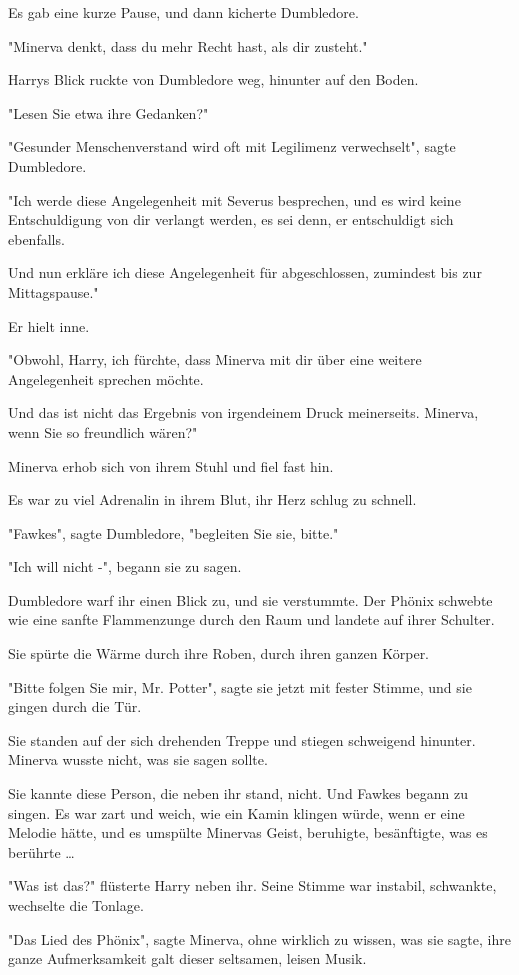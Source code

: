 {Es gab eine kurze Pause, und dann kicherte Dumbledore.

"Minerva denkt, dass du mehr Recht hast, als dir zusteht."

Harrys Blick ruckte von Dumbledore weg, hinunter auf den Boden.

"Lesen Sie etwa ihre Gedanken?"

"Gesunder Menschenverstand wird oft mit Legilimenz verwechselt", sagte Dumbledore.

"Ich werde diese Angelegenheit mit Severus besprechen, und es wird keine Entschuldigung von dir verlangt werden, es sei denn, er entschuldigt sich ebenfalls.

Und nun erkläre ich diese Angelegenheit für abgeschlossen, zumindest bis zur Mittagspause."

Er hielt inne.

"Obwohl, Harry, ich fürchte, dass Minerva mit dir über eine weitere Angelegenheit sprechen möchte.

Und das ist nicht das Ergebnis von irgendeinem Druck meinerseits. Minerva, wenn Sie so freundlich wären?"

Minerva erhob sich von ihrem Stuhl und fiel fast hin.

Es war zu viel Adrenalin in ihrem Blut, ihr Herz schlug zu schnell.

"Fawkes", sagte Dumbledore, "begleiten Sie sie, bitte."

"Ich will nicht -", begann sie zu sagen.

Dumbledore warf ihr einen Blick zu, und sie verstummte. Der Phönix schwebte wie eine sanfte Flammenzunge durch den Raum und landete auf ihrer Schulter.

Sie spürte die Wärme durch ihre Roben, durch ihren ganzen Körper.

"Bitte folgen Sie mir, Mr. Potter", sagte sie jetzt mit fester Stimme, und sie gingen durch die Tür.

Sie standen auf der sich drehenden Treppe und stiegen schweigend hinunter. Minerva wusste nicht, was sie sagen sollte.

Sie kannte diese Person, die neben ihr stand, nicht. Und Fawkes begann zu singen. Es war zart und weich, wie ein Kamin klingen würde, wenn er eine Melodie hätte, und es umspülte Minervas Geist, beruhigte, besänftigte, was es berührte …

"Was ist das?" flüsterte Harry neben ihr. Seine Stimme war instabil, schwankte, wechselte die Tonlage.

"Das Lied des Phönix", sagte Minerva, ohne wirklich zu wissen, was sie sagte, ihre ganze Aufmerksamkeit galt dieser seltsamen, leisen Musik.

}
